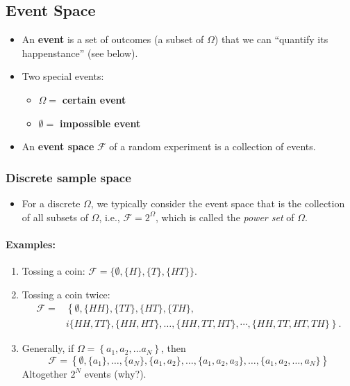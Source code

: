 \subsection{Event Space}
\begin{itemize}
\item An \textbf{event} is a set of outcomes (a subset of \(\Omega\))
   that we can ``quantify its happenstance'' (see below). 
\item Two special events: 
\begin{itemize}
\item \(\Omega =\)  \textbf{certain event} 
\item \(\emptyset =\) \textbf{impossible event}
\end{itemize}
\item An \textbf{event space} \(\mathcal{F}\) of a random experiment
is a collection of events.
\end{itemize}

\subsubsection{Discrete sample space}
\begin{itemize}
\item For a discrete \(\Omega\), we typically consider the event space
that is the collection
of all subsets of \(\Omega\), i.e., \(\mathcal{F} = 2^{\Omega}\),
which is called the \emph{power set} of \(\Omega\).
\end{itemize}

\paragraph{Examples:}
\begin{enumerate}
\item Tossing a coin: \(\mathcal{F} =\{\emptyset,\{H\},\{T\},\{H T\}\}\).
\item Tossing a coin twice:  
\begin{align*}
\mathcal{F} =& \left\{\emptyset,\{H H\},\{T T\},\{H T\},\{T H\},
 \right. \\
 &i \left. \{H H, T T\},\{H H, H T\}, \ldots, 
\{H H, T T, H T\}, \cdots,\{H H, T T, H T, T H\} \right\}.
\end{align*}
\item Generally, if 
\( \Omega=\left\{a_{1}, a_{2}, \ldots
a_{N}\right\}\), then 
\begin{equation*}
\mathcal{F}=\left\{\emptyset,\{a_{1}\},
\ldots,\{a_{N}\}, \{a_{1}, a_{2}\},
\ldots,\{a_{1}, a_{2}, a_{3}\}, \ldots,
\{a_{1}, a_{2}, \ldots, a_{N}\}\right\}
\end{equation*}
Altogether \(2^{N}\) events (why?).
\end{enumerate}

